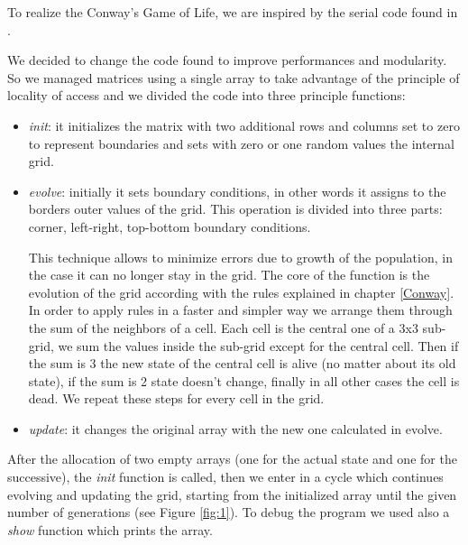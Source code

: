 \documentclass[a4paper,11pt,twoside]{report}
\begin{document}
\noindent To realize the Conway's Game of Life, we are inspired by the serial code found in \cite{code}.

\noindent We decided to change the code found to improve performances and modularity.
So we managed matrices using a single array to take advantage of the principle of locality of access and we divided the code into three principle functions:

\begin{itemize}
	\item \emph{init}: it initializes the matrix with two additional rows and columns set to zero to represent boundaries and sets with zero or one random values the internal grid.

	\item \emph{evolve}: initially it sets boundary conditions, in other words it assigns to the borders outer values of the grid. This operation is divided into three parts: corner, left-right, top-bottom boundary conditions.

	\noindent This technique allows to minimize errors due to growth of the population, in the case it can no longer stay in the grid. The core of the function is the evolution of the grid according with the rules explained in chapter \ref{Conway}. In order to apply rules in a faster and simpler way we arrange them through the sum of the neighbors of a cell. Each cell is the central one of a 3x3
sub-grid, we sum the values inside the sub-grid except for the central cell. Then if the sum is 3 the new state of the central cell is alive (no matter about its old state), if the sum is 2 state
doesn't change, finally in all other cases the cell is dead. We repeat these steps for every cell in the grid.

	\item \emph{update}: it changes the original array with the new one calculated in evolve.



\end{itemize}

\noindent After the allocation of two empty arrays (one for the actual state and one for the successive), the \emph{init} function is called, then we enter in a cycle which continues evolving and updating the grid, starting from the initialized array until the given number of generations (see Figure \ref{fig:1}).
To debug the program we used also a \emph{show} function which prints the array.
\end{document}
